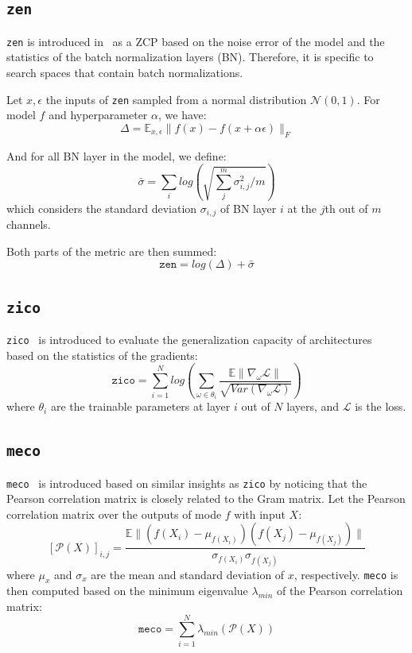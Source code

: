 \documentclass[10pt]{article} %
\begin{document}
\subsection{\texttt{zen}}

\texttt{zen} is introduced in~\citet{lin2021zen} as a ZCP based on the noise error of the model and the statistics of the batch normalization layers (BN). Therefore, it is specific to search spaces that contain batch normalizations.

Let $x, \epsilon$ the inputs of \texttt{zen} sampled from a normal distribution $\mathcal{N}(0, 1)$. For model $f$ and hyperparameter $\alpha$, we have:
$$
\Delta = \mathbb{E}_{x, \epsilon}\|f(x) - f(x +\alpha\epsilon)\|_F
$$

And for all BN layer in the model, we define:
$$
\bar{\sigma} = \textstyle\sum_i log \left(\sqrt{\textstyle\sum_j^m \sigma_{i, j} ^2/m} \right)
$$
which considers the standard deviation $\sigma_{i,j}$ of BN layer $i$ at the $j$th out of $m$ channels.

Both parts of the metric are then summed:
$$
\texttt{zen} = log(\Delta) + \bar{\sigma}
$$

\subsection{\texttt{zico}}

\texttt{zico}~\citep{li2023zico} is introduced to evaluate the generalization capacity of architectures~\citep{keskar2016large, liang2017fisher} based on the statistics of the gradients:
$$
\texttt{zico} = \sum_{i=1}^N log \left( \sum_{\omega \in \theta_i} \frac{\mathbb{E\|\nabla_\omega\mathcal{L}\|}}{\sqrt{Var(\nabla_\omega\mathcal{L})}}\right)
$$
where $\theta_i$ are the trainable parameters at layer $i$ out of $N$ layers, and $\mathcal{L}$ is the loss.

\subsection{\texttt{meco}}

\texttt{meco}~\citep{jiang2023meco} is introduced based on similar insights as \texttt{zico} by noticing that the Pearson correlation matrix is closely related to the Gram matrix. Let the Pearson correlation matrix over the outputs of mode $f$ with input $X$:
$$
[\mathcal{P}(X)]_{i,j} = \frac{\mathbb{E}\|(f(X_i) - \mu_{f(X_i)})(f(X_j) - \mu_{f(X_j)})\|}{\sigma_{f(X_i)}\sigma_{f(X_j)}}
$$
where $\mu_x$ and $\sigma_x$ are the mean and standard deviation of $x$, respectively. \texttt{meco} is then computed based on the minimum eigenvalue $\lambda_{min}$ of the Pearson correlation matrix:
$$
\texttt{meco} = \textstyle\sum_{i=1}^N \lambda_{min}(\mathcal{P}(X))
$$
\end{document}
